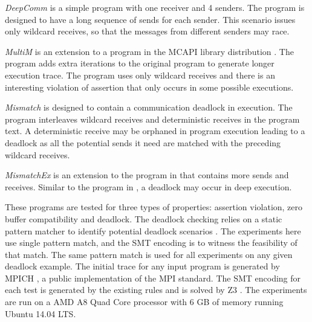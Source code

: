 \begin{compactitem}
\item \textit{DeepComm} is a simple program with one receiver and 4 senders. The program is designed to have a long sequence of sends for each sender.
This scenario issues only wildcard receives, so that the messages from different senders may race.

\item \textit{MultiM} is an extension to a program in the MCAPI library distribution \cite{DBLP:conf/kbse/HuangMM13}. The program adds extra iterations to the original program to generate longer execution trace. The program uses only wildcard receives and there is an interesting violation of assertion that only occurs in some possible executions.

\item \textit{Mismatch} is designed to contain a communication deadlock in execution. The program interleaves wildcard receives and deterministic receives in the program text. A deterministic receive may be orphaned in program execution leading to a deadlock as all the potential sends it need are matched with the preceding wildcard receives. 

\item \textit{MismatchEx} is an extension to the program in  that contains more sends and receives. Similar to the program in , a deadlock may occur in deep execution. 
\end{compactitem}


These programs are tested for three types of properties: assertion violation, zero buffer compatibility and deadlock. 
The deadlock checking relies on a static pattern matcher to identify potential deadlock scenarios \cite{}. 
The experiments here use single pattern match, and the SMT encoding is to witness the feasibility of that match. The same pattern match is used for all experiments on any given deadlock example. 
The initial trace for any input program is generated by MPICH \cite{mpich}, a public implementation of the MPI standard.
The SMT encoding for each test is generated by the existing rules \cite{DBLP:conf/kbse/HuangMM13,HuangNFM15} and is solved by Z3 \cite{demoura:tacas08}. 
The experiments are run on a AMD A8 Quad Core processor with 6 GB of memory running Ubuntu 14.04 LTS. 

